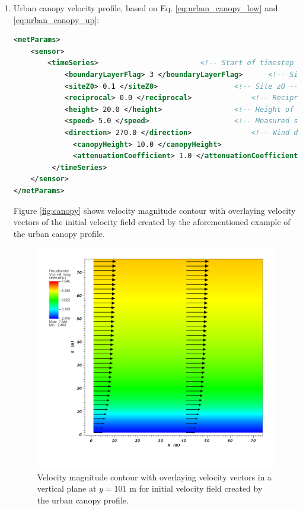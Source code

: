 \begin{enumerate}
\item Urban canopy velocity profile, based on Eq. \ref{eq:urban_canopy_low} and \ref{eq:urban_canopy_up}:

\begin{lstlisting}[language=XML]
<metParams>
	<sensor>
	    <timeSeries>						<!-- Start of timestep informastion for a sensor -->
       		<boundaryLayerFlag> 3 </boundaryLayerFlag> 		<!-- Site boundary layer flag (1-log (default), 2-exp, 3-urban canopy, 4-data entry) -->
       		<siteZ0> 0.1 </siteZ0> 					<!-- Site z0 -->
       		<reciprocal> 0.0 </reciprocal> 				<!-- Reciprocal Monin-Obukhov Length (1/m) -->
       		<height> 20.0 </height> 				<!-- Height of the sensor -->
       		<speed> 5.0 </speed> 					<!-- Measured speed at the sensor height -->
       		<direction> 270.0 </direction> 				<!-- Wind direction of sensor -->
		      <canopyHeight> 10.0 </canopyHeight>
		      <attenuationCoefficient> 1.0 </attenuationCoefficient>
    	 </timeSeries>
	</sensor>
</metParams>
\end{lstlisting}

Figure \ref{fig:canopy} shows velocity magnitude contour with overlaying  velocity vectors of the initial velocity field created by the aforementioned example of the urban canopy profile.

\begin{figure}[H]
\includegraphics[width=\textwidth,keepaspectratio]{Images/canopy_y_101.png}
\caption{Velocity magnitude contour with overlaying velocity vectors in a vertical plane at $y=101$ m for initial velocity field created by the urban canopy profile.}
\end{figure}
\noindent


\end{enumerate}
